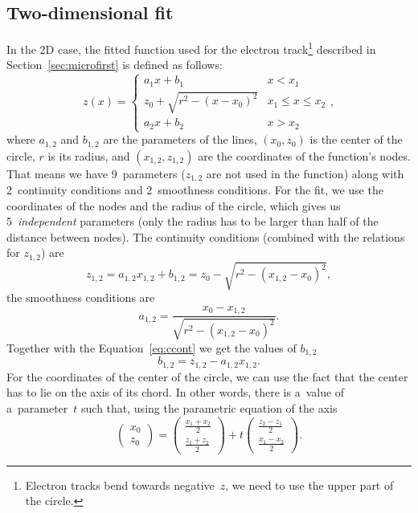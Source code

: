 		\subsection{Two-dimensional fit}
			In the 2D case, the fitted function used for the electron track\footnote{Electron tracks bend towards negative~$z$, we need to use the upper part of the circle.} described in Section~\ref{sec:microfirst} is defined as follows:
				\begin{equation}
					\label{eq:clines2d}
					z(x) = \begin{cases}
								a_1x+b_1 & x<x_1\\
								z_0+\sqrt{r^2-(x-x_0)^2} & x_1\leq x\leq x_2\\
								a_2x+b_2 & x>x_2
						   \end{cases},
				\end{equation}
			where $a_{1,2}$ and $b_{1,2}$ are the parameters of the lines, $(x_0,z_0)$ is the center of the circle, $r$ is its radius, and $(x_{1,2},z_{1,2})$ are the coordinates of the function's nodes. That means we have 9~parameters ($z_{1,2}$ are not used in the function) along with 2~continuity conditions and 2~smoothness conditions. For the fit, we use the coordinates of the nodes and the radius of the circle, which gives us 5~\emph{independent} parameters (only the radius has to be larger than half of the distance between nodes). The continuity conditions (combined with the relations for $z_{1,2}$) are
				\begin{equation}
					\label{eq:ccont}
					z_{1,2} = a_{1,2}x_{1,2}+b_{1,2} = z_0-\sqrt{r^2-(x_{1,2}-x_0)^2},
				\end{equation}
			the smoothness conditions are
				\begin{equation}
					\label{eq:a12}
					a_{1,2} = \frac{x_0-x_{1,2}}{\sqrt{r^2-(x_{1,2}-x_0)^2}}.
				\end{equation}
			Together with the Equation~\ref{eq:ccont} we get the values of $b_{1,2}$
				\begin{equation}
					\label{eq:b12}
					b_{1,2} = z_{1,2} - a_{1,2} x_{1,2}.
				\end{equation}
			For the coordinates of the center of the circle, we can use the fact that the center has to lie on the axis of its chord. In other words, there is a~value of a~parameter~$t$ such that, using the parametric equation of the axis
				\begin{equation}
					\begin{pmatrix} x_0\\ z_0 \end{pmatrix} = \begin{pmatrix} \frac{x_1+x_2}{2}\\ \frac{z_1+z_2}{2} \end{pmatrix} + t \begin{pmatrix} \frac{z_2-z_1}{2}\\ \frac{x_1-x_2}{2} \end{pmatrix}.
				\end{equation}
